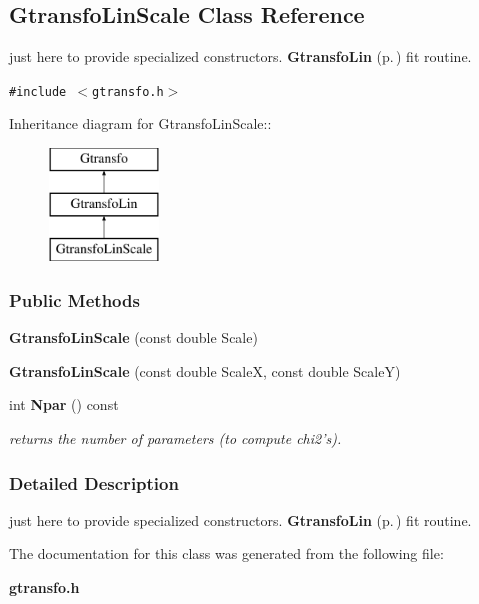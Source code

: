 \subsection{Gtransfo\-Lin\-Scale  Class Reference}
\label{class_gtransfolinscale}
just here to provide specialized constructors. {\bf Gtransfo\-Lin} {\rm (p.\,\pageref{class_gtransfolin})} fit routine. 


{\tt \#include $<$gtransfo.h$>$}

Inheritance diagram for Gtransfo\-Lin\-Scale::\begin{figure}[H]
\begin{center}
\leavevmode
\includegraphics[height=3cm]{class_gtransfolinscale}
\end{center}
\end{figure}
\subsubsection*{Public Methods}
\begin{CompactItemize}
\item 
{}
{\bf Gtransfo\-Lin\-Scale} (const double Scale)\label{class_gtransfolinscale_a0}

\item 
{}
{\bf Gtransfo\-Lin\-Scale} (const double Scale\-X, const double Scale\-Y)\label{class_gtransfolinscale_a1}

\item 
{}
int {\bf Npar} () const\label{class_gtransfolinscale_a2}

\begin{CompactList}\small\item\em returns the number of parameters (to compute chi2's).\item\end{CompactList}\end{CompactItemize}


\subsubsection{Detailed Description}
just here to provide specialized constructors. {\bf Gtransfo\-Lin} {\rm (p.\,\pageref{class_gtransfolin})} fit routine.



The documentation for this class was generated from the following file:\begin{CompactItemize}
\item 
{\bf gtransfo.h}\end{CompactItemize}
